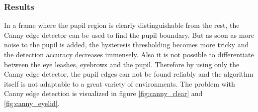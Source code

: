 \subsubsection{Results}
In a frame where the pupil region is clearly distinguishable from the rest, the Canny edge detector can be used to find the pupil boundary. But as soon as more noise to the pupil is added, the hysteresis thresholding becomes more tricky and the detection accuracy decreases immensely. Also it is not possible to differentiate between the eye leashes, eyebrows and the pupil. Therefore by using only the Canny edge detector, the pupil edges can not be found reliably and the algorithm itself is not adaptable to a great variety of environments. The problem with Canny edge detection is visualized in figure \ref{fig:canny_clear} and \ref{fig:canny_eyelid}.


